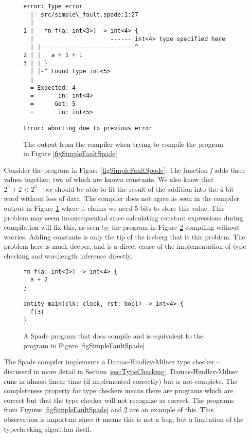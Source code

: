 \begin{figure}[h!]
\centering
  \begin{verbatim}
error: Type error
  |- src/simple\_fault.spade:1:27
  |
1 |   fn f(a: int<3>) -> int<4> {
  |                      ------ int<4> type specified here
  | |---------------------------^
2 | |   a + 1 + 1
3 | | }
  | |-^ Found type int<5>
  |
  = Expected: 4
  =       in: int<4>
  =      Got: 5
  =       in: int<5>

Error: aborting due to previous error
\end{verbatim}
\caption{The output from the compiler when trying to compile the program in Figure \ref{figSimpleFaultSpade}}
\label{figSimpleFaultSpadeCompileOutput}
\end{figure}

Consider the program in Figure \ref{figSimpleFaultSpade}. The function \textit{f} adds three values together, two of which are known constants. We also know that $2^2 + 2 < 2^3$ -- we should be able to fit the result of the addition into the 4 bit word without loss of data. The compiler does not agree as seen in the compiler output in Figure \ref{figSimpleFaultSpadeCompileOutput} where it claims we need 5 bits to store this value. This problem may seem inconsequential since calculating constant expressions during compilation will fix this, as seen by the program in Figure \ref{figSimpleCorrectSpade} compiling without worries. Adding constants is only the tip of the iceberg that is this problem. The problem here is much deeper, and is a direct cause of the implementation of type checking and wordlength inference directly.

\begin{figure}[h!]
\centering
  \begin{verbatim}
fn f(a: int<3>) -> int<4> {
  a + 2
}

entity main(clk: clock, rst: bool) -> int<4> {
  f(3)
}
\end{verbatim}
  \caption{ A Spade program that does compile and is equivalent to the program in Figure \ref{figSimpleFaultSpade}}
\label{figSimpleCorrectSpade}
\end{figure}

The Spade compiler implements a Damas-Hindley-Milner type checker -- discussed in more detail in Section \ref{sec:TypeChecking}. Damas-Hindley-Milner runs in almost linear time (if implemented correctly) but is not complete. The completeness property for type checkers means there are programs which are correct but that the type checker will not recognize as correct. The programs from Figures \ref{figSimpleFaultSpade} and \ref{figSimpleCorrectSpade} are an example of this. This observation is important since it means this is not a bug, but a limitation of the typechecking algorithm itself.

